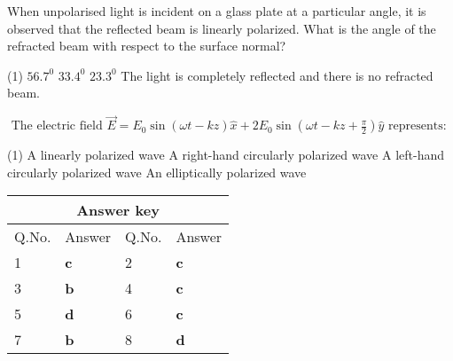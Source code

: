 \begin{enumerate}
\begin{tasks}
\end{tasks}
\begin{minipage}{\textwidth}
	\item When unpolarised light is incident on a glass plate at a particular angle, it is observed that the reflected beam is linearly polarized. What is the angle of the refracted beam with respect to the surface normal?
\end{minipage}
\begin{tasks}(1)
	\task[\textbf{A.}] $56.7^{0}$
	\task[\textbf{B.}]$33.4^{0}$
	\task[\textbf{C.}]$23.3^{0}$
	\task[\textbf{D.}]The light is completely reflected and there is no refracted beam.
\end{tasks}
\begin{minipage}{\textwidth}
	\item $\text { The electric field } \vec{E}=E_{0} \sin (\omega t-k z) \hat{x}+2 E_{0} \sin \left(\omega t-k z+\frac{\pi}{2}\right) \hat{y} \text { represents: }$
\end{minipage}
\begin{tasks}(1)
	\task[\textbf{A.}]A linearly polarized wave
	\task[\textbf{B.}]A right-hand circularly polarized wave
	\task[\textbf{C.}]A left-hand circularly polarized wave
	\task[\textbf{D.}]An elliptically polarized wave
\end{tasks}
\end{enumerate}
\setlength\arrayrulewidth{1pt}
\begin{table}[H]
	\centering
	
	\begin{tabular}{|p{1.5cm}|p{1.5cm}||p{1.5cm}|p{1.5cm}|}
		\hline
		\multicolumn{4}{|c|}{\textbf{Answer key}}\\\hline\hline
		\rowcolor{ocrel}Q.No.&Answer&Q.No.&Answer\\\hline
		1&\textbf{c}&2&\textbf{c}\\\hline
		3&\textbf{b}&4&\textbf{c}\\\hline
		5&\textbf{d}&6&\textbf{c}\\\hline
		7&\textbf{b}&8&\textbf{d}\\\hline
	\end{tabular}
\end{table}





































